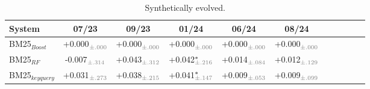 \begin{table}[t]
\small
\centering
\renewcommand{\tabcolsep}{2.8pt}
\caption{Synthetically evolved.}
\label{tab:table-results-fold}

\begin{tabular}{@{}lcccccccccc@{}}
    \toprule
    \bfseries System & \bfseries 07/23 & \bfseries 09/23 & \bfseries 01/24 & \bfseries 06/24 & \bfseries 08/24 \\
    
    \midrule

    
    BM25$_{Boost}$ & +0.000$^{\phantom{*}}_{\color{gray}\pm.000}$ & +0.000$^{\phantom{*}}_{\color{gray}\pm.000}$ & +0.000$^{\phantom{*}}_{\color{gray}\pm.000}$ & +0.000$^{\phantom{*}}_{\color{gray}\pm.000}$ & +0.000$^{\phantom{*}}_{\color{gray}\pm.000}$ \\
    BM25$_{RF}$ & -0.007$^{\phantom{*}}_{\color{gray}\pm.314}$ & +0.043$^{\phantom{*}}_{\color{gray}\pm.312}$ & +0.042$^{*}_{\color{gray}\pm.216}$ & +0.014$^{\phantom{*}}_{\color{gray}\pm.084}$ & +0.012$^{\phantom{*}}_{\color{gray}\pm.129}$ \\
    BM25$_{keyquery}$ & +0.031$^{\phantom{*}}_{\color{gray}\pm.273}$ & +0.038$^{\phantom{*}}_{\color{gray}\pm.215}$ & +0.041$^{*}_{\color{gray}\pm.147}$ & +0.009$^{\phantom{*}}_{\color{gray}\pm.053}$ & +0.009$^{\phantom{*}}_{\color{gray}\pm.099}$ \\



\bottomrule
\end{tabular}
\end{table}

